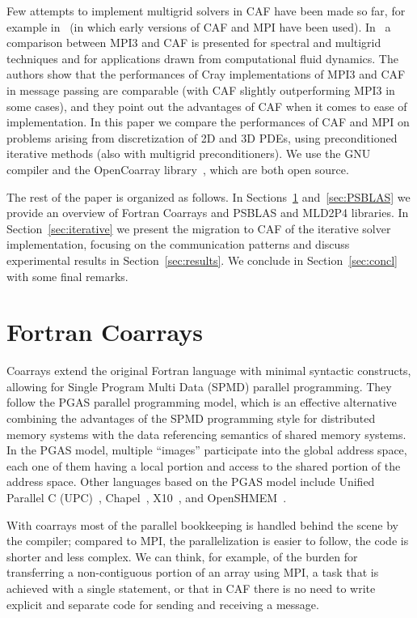 \documentclass{IOS-Book-Article}
\begin{document}
Few attempts to implement multigrid solvers in CAF have been made so far, for
example in~\cite{Numrich:1998} (in which early versions of CAF and MPI
have been used).  In~\cite{Garain:2015} a comparison between MPI3 and
CAF is presented for spectral and multigrid techniques and for
applications drawn from computational fluid dynamics. The authors show that the performances of 
Cray implementations of MPI3 and CAF in message passing 
are comparable (with CAF slightly outperforming MPI3 in some cases), and
they point out the advantages of CAF when it comes to ease of
implementation. In this paper we compare the performances of CAF and MPI
on problems arising from discretization of 2D and 3D PDEs, using
preconditioned iterative methods (also with multigrid
preconditioners). We use the GNU compiler and the OpenCoarray
library~\cite{PGAS14}, which are both open source. %

The rest of the paper is organized as follows. 
In Sections~\ref{sec:CAF} and~\ref{sec:PSBLAS} we provide an overview of Fortran Coarrays 
and PSBLAS and MLD2P4 libraries. 
In Section~\ref{sec:iterative} we present the migration to CAF of the iterative solver implementation, 
focusing on the communication patterns and discuss experimental results in Section~\ref{sec:results}. 
We conclude in Section~\ref{sec:concl} with some final remarks. 

\section{Fortran Coarrays} \label{sec:CAF}

Coarrays extend the original Fortran language with minimal syntactic 
constructs, allowing for Single Program Multi Data (SPMD) parallel
programming.  
They follow the PGAS parallel programming model, which is an effective alternative combining the
advantages of the SPMD programming style for distributed memory
systems with the data referencing semantics of shared memory systems.  
In the PGAS model, multiple ``images'' participate into  the global
address space, each one of them having a local portion and access to
the shared portion of the address space. 
Other languages based on the PGAS model include Unified Parallel C
(UPC)~\cite{UPCSpec},  Chapel~\cite{chapel}, X10~\cite{Charles:2005}, and OpenSHMEM~\cite{Chapman:2010}.

With coarrays most of the parallel bookkeeping is handled behind the scene by
the compiler;  compared to MPI, the parallelization is easier to
follow, the code is shorter and less complex. We can think, for
example, of the burden for transferring a non-contiguous portion of an
array using MPI, a task that is achieved with a single statement, 
or  that in  CAF there is no need to write explicit and separate code
for sending and receiving a message. 
\end{document}
